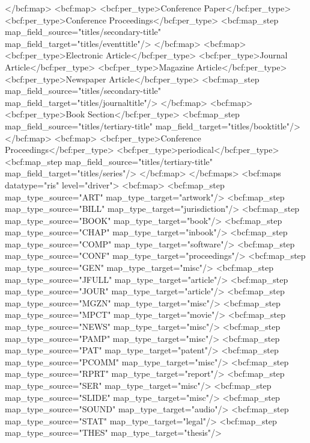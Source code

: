       </bcf:map>
      <bcf:map>
        <bcf:per_type>Conference Paper</bcf:per_type>
        <bcf:per_type>Conference Proceedings</bcf:per_type>
        <bcf:map_step map_field_source="titles/secondary-title" map_field_target="titles/eventtitle"/>
      </bcf:map>
      <bcf:map>
        <bcf:per_type>Electronic Article</bcf:per_type>
        <bcf:per_type>Journal Article</bcf:per_type>
        <bcf:per_type>Magazine Article</bcf:per_type>
        <bcf:per_type>Newspaper Article</bcf:per_type>
        <bcf:map_step map_field_source="titles/secondary-title" map_field_target="titles/journaltitle"/>
      </bcf:map>
      <bcf:map>
        <bcf:per_type>Book Section</bcf:per_type>
        <bcf:map_step map_field_source="titles/tertiary-title" map_field_target="titles/booktitle"/>
      </bcf:map>
      <bcf:map>
        <bcf:per_type>Conference Proceedings</bcf:per_type>
        <bcf:per_type>periodical</bcf:per_type>
        <bcf:map_step map_field_source="titles/tertiary-title" map_field_target="titles/series"/>
      </bcf:map>
    </bcf:maps>
    <bcf:maps datatype="ris" level="driver">
      <bcf:map>
        <bcf:map_step map_type_source="ART" map_type_target="artwork"/>
        <bcf:map_step map_type_source="BILL" map_type_target="jurisdiction"/>
        <bcf:map_step map_type_source="BOOK" map_type_target="book"/>
        <bcf:map_step map_type_source="CHAP" map_type_target="inbook"/>
        <bcf:map_step map_type_source="COMP" map_type_target="software"/>
        <bcf:map_step map_type_source="CONF" map_type_target="proceedings"/>
        <bcf:map_step map_type_source="GEN" map_type_target="misc"/>
        <bcf:map_step map_type_source="JFULL" map_type_target="article"/>
        <bcf:map_step map_type_source="JOUR" map_type_target="article"/>
        <bcf:map_step map_type_source="MGZN" map_type_target="misc"/>
        <bcf:map_step map_type_source="MPCT" map_type_target="movie"/>
        <bcf:map_step map_type_source="NEWS" map_type_target="misc"/>
        <bcf:map_step map_type_source="PAMP" map_type_target="misc"/>
        <bcf:map_step map_type_source="PAT" map_type_target="patent"/>
        <bcf:map_step map_type_source="PCOMM" map_type_target="misc"/>
        <bcf:map_step map_type_source="RPRT" map_type_target="report"/>
        <bcf:map_step map_type_source="SER" map_type_target="misc"/>
        <bcf:map_step map_type_source="SLIDE" map_type_target="misc"/>
        <bcf:map_step map_type_source="SOUND" map_type_target="audio"/>
        <bcf:map_step map_type_source="STAT" map_type_target="legal"/>
        <bcf:map_step map_type_source="THES" map_type_target="thesis"/>
